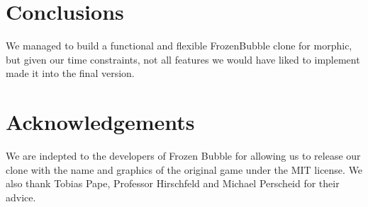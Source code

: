 \section{Conclusions}
We managed to build a functional and flexible FrozenBubble clone for morphic,
but given our time constraints, not all features we would have liked to implement
made it into the final version. 

\section*{Acknowledgements}
We are indepted to the developers of Frozen Bubble for allowing us to release 
our clone with the name and graphics of the original game under the MIT 
license. We also thank Tobias Pape, Professor Hirschfeld and Michael Perscheid for 
their advice.

